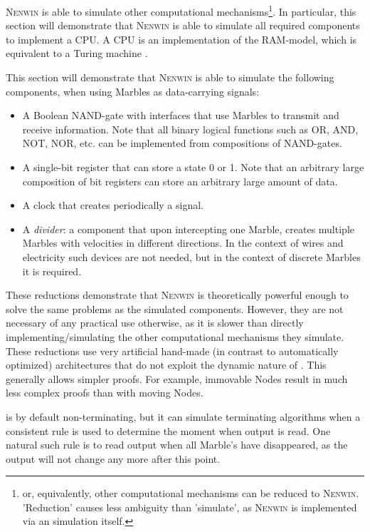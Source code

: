 \textsc{Nenwin} is able to simulate other computational mechanisms\footnote{
or, equivalently, other computational mechanisms can be reduced to \textsc{Nenwin}. 
'Reduction' causes less ambiguity than 'simulate', as \textsc{Nenwin} is implemented via an simulation itself.}. 
In particular, this section will demonstrate that \textsc{Nenwin} is able to simulate all required components to implement a CPU. 
A CPU is an implementation of the RAM-model, which is equivalent to a Turing machine \cite{RAM_cook_reckhow}.

This section will demonstrate that \textsc{Nenwin} is able to simulate the following components, when using Marbles as data-carrying signals:
\begin{itemize}
    \item A Boolean NAND-gate with interfaces that use Marbles to transmit and receive information. Note that all binary logical functions such as OR, AND, NOT, NOR, etc. can be implemented from compositions of NAND-gates.
    \item A single-bit register that can store a state 0 or 1. Note that an arbitrary large composition of bit registers can store an arbitrary large amount of data.
    \item A clock that creates periodically a signal.
    \item A \textit{divider}: a component that upon intercepting one Marble, creates multiple Marbles with velocities in different directions. In the context of wires and electricity such devices are not needed, but in the context of discrete Marbles it is required.
\end{itemize}

These reductions demonstrate that \textsc{Nenwin} is theoretically powerful enough 
to solve the same problems as the simulated components.  However, they are not necessary of any practical use otherwise, as it is slower than directly implementing/simulating the other computational mechanisms they simulate.
These reductions use very artificial hand-made (in contrast to automatically optimized) architectures that 
do not exploit the dynamic nature of \nenwin. This generally allows simpler proofs. 
For example, immovable Nodes result in much less complex proofs than with moving Nodes. 

\nenwin is by default non-terminating, 
but it can simulate terminating algorithms when a consistent rule is used to determine the moment when output is read.
One natural such rule is to read output when all Marble's have disappeared, 
as the output will not change any more after this point.

